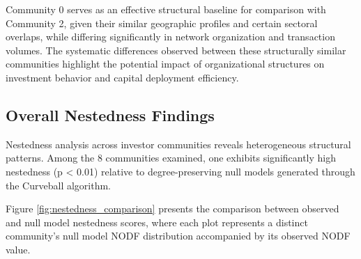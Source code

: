 Community 0 serves as an effective structural baseline for comparison with Community 2, given their similar geographic profiles and certain sectoral overlaps, while differing significantly in network organization and transaction volumes. The systematic differences observed between these structurally similar communities highlight the potential impact of organizational structures on investment behavior and capital deployment efficiency.

\subsection{Overall Nestedness Findings}

\newcommand{\numCommAnalysedNestedness}{8}

Nestedness analysis across investor communities reveals heterogeneous structural patterns. Among the \numCommAnalysedNestedness{} communities examined, one exhibits significantly high nestedness (p < 0.01) relative to degree-preserving null models generated through the Curveball algorithm.

Figure \ref{fig:nestedness_comparison} presents the comparison between observed and null model nestedness scores, where each plot represents a distinct community's null model NODF distribution accompanied by its observed NODF value.

